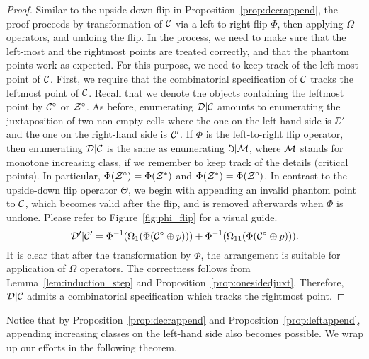 \documentclass[12pt, a4paper, twoside]{report}
\begin{document}
\begin{proof}
Similar to the upside-down flip in Proposition~\ref{prop:decrappend}, the proof proceeds by transformation of $\mathcal{C}$ via a left-to-right flip $\Phi$, then applying $\Omega$ operators, and undoing the flip. In the process, we need to make sure that the left-most and the rightmost points are treated correctly, and that the phantom points work as expected. For this purpose, we need to keep track of the left-most point of $\mathcal{C}$. First, we require that the combinatorial specification of $\mathcal{C}$ tracks the leftmost point of $\mathcal{C}$. Recall that we denote the objects containing the leftmost point by $\mathcal{C}^\circ$ or $\mathcal{Z}^\circ$. As before, enumerating $\mathcal{D}|\mathcal{C}$ amounts to enumerating the juxtaposition of two non-empty cells where the one on the left-hand side is $\DD'$ and the one on the right-hand side is $\mathcal{C}'$. If $\Phi$ is the left-to-right flip operator, then enumerating $\mathcal{D}|\mathcal{C}$ is the same as enumerating $\reflectbox{\C}|\M$, where $\mathcal{M}$ stands for monotone increasing class, if we remember to keep track of the details (critical points). In particular, $\Phi(\mathcal{Z}^\circ) = \Phi(\mathcal{Z}^*)$ and $\Phi(\mathcal{Z}^*) = \Phi(\mathcal{Z}^\circ)$. In contrast to the upside-down flip operator $\Theta$, we begin with appending an invalid phantom point to $\mathcal{C}$, which becomes valid after the flip, and is removed afterwards when $\Phi$ is undone. Please refer to Figure~\ref{fig:phi_flip} for a visual guide. 
$$\mathcal{D}'|\mathcal{C}' = \Phi^{-1}(\Omega_1(\Phi(\mathcal{C}^\circ\oplus p))) + \Phi^{-1}(\Omega_{11}(\Phi(\mathcal{C}^\circ\oplus p))).$$
It is clear that after the transformation by $\Phi$, the arrangement is suitable for application of $\Omega$ operators. The correctness follows from Lemma~\ref{lem:induction_step} and Proposition~\ref{prop:onesidedjuxt}. Therefore, $\mathcal{D}|\mathcal{C}$ admits a combinatorial specification which tracks the rightmost point.
\end{proof}
Notice that by Proposition~\ref{prop:decrappend} and Proposition~\ref{prop:leftappend}, appending increasing classes on the left-hand side also becomes possible. We wrap up our efforts in the following theorem.
\end{document}
